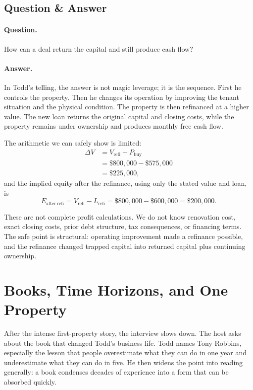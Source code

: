 \subsection{Question \& Answer}

\paragraph{Question.}
How can a deal return the capital and still produce cash flow?

\paragraph{Answer.}
In Todd's telling, the answer is not magic leverage; it is the sequence. First he controls the property. Then he changes its operation by improving the tenant situation and the physical condition. The property is then refinanced at a higher value. The new loan returns the original capital and closing costs, while the property remains under ownership and produces monthly free cash flow.

The arithmetic we can safely show is limited:
\begin{align}
\Delta V
&=
V_{\mathrm{refi}}-P_{\mathrm{buy}} \\
&=
\$800{,}000-\$575{,}000 \\
&=
\$225{,}000,
\end{align}
and the implied equity after the refinance, using only the stated value and loan, is
\begin{equation}
E_{\mathrm{after\ refi}}
=
V_{\mathrm{refi}}-L_{\mathrm{refi}}
=
\$800{,}000-\$600{,}000
=
\$200{,}000.
\end{equation}

These are not complete profit calculations. We do not know renovation cost, exact closing costs, prior debt structure, tax consequences, or financing terms. The safe point is structural: operating improvement made a refinance possible, and the refinance changed trapped capital into returned capital plus continuing ownership.

\section{Books, Time Horizons, and One Property}

After the intense first-property story, the interview slows down. The host asks about the book that changed Todd's business life. Todd names Tony Robbins, especially the lesson that people overestimate what they can do in one year and underestimate what they can do in five. He then widens the point into reading generally: a book condenses decades of experience into a form that can be absorbed quickly.

